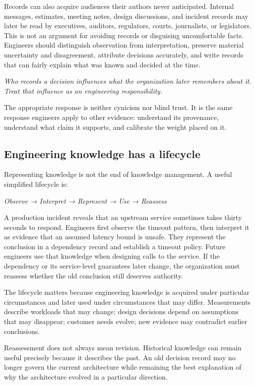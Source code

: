 Records can also acquire audiences their authors never anticipated. Internal messages, estimates,
meeting notes, design discussions, and incident records may later be read by executives, auditors,
regulators, courts, journalists, or legislators. This is not an argument for avoiding records or
disguising uncomfortable facts. Engineers should distinguish observation from interpretation,
preserve material uncertainty and disagreement, attribute decisions accurately, and write records
that can fairly explain what was known and decided at the time.

\emph{Who records a decision influences what the organization later remembers about it. Treat that
influence as an engineering responsibility.}

The appropriate response is neither cynicism nor blind trust. It is the same response engineers
apply to other evidence: understand its provenance, understand what claim it supports, and calibrate
the weight placed on it.

\subsection{Engineering knowledge has a lifecycle}\label{sec-knowledge-lifecycle}

Representing knowledge is not the end of knowledge management. A useful simplified lifecycle is:

\emph{Observe → Interpret → Represent → Use → Reassess}

A production incident reveals that an upstream service sometimes takes thirty seconds to respond.
Engineers first observe the timeout pattern, then interpret it as evidence that an assumed latency
bound is unsafe. They represent the conclusion in a dependency record and establish a timeout
policy. Future engineers use that knowledge when designing calls to the service. If the dependency
or its service-level guarantees later change, the organization must reassess whether the old
conclusion still deserves authority.

The lifecycle matters because engineering knowledge is acquired under particular circumstances and
later used under circumstances that may differ. Measurements describe workloads that may change;
design decisions depend on assumptions that may disappear; customer needs evolve; new evidence may
contradict earlier conclusions.

Reassessment does not always mean revision. Historical knowledge can remain useful precisely because
it describes the past. An old decision record may no longer govern the current architecture while
remaining the best explanation of why the architecture evolved in a particular direction.

